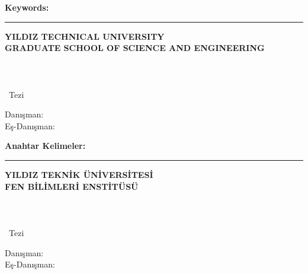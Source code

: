 \abstractTextEnglish

{\bfseries Keywords:} \abstractKeywordsEnglish

\vfill


\begin{center}
\rule{0.8\textwidth}{.1pt}

\bfseries \small
 YILDIZ TECHNICAL UNIVERSITY\\
 GRADUATE SCHOOL OF SCIENCE AND ENGINEERING
\end{center}

\newpage
\chapter*{\tabstract}

\begin{center}
{\bfseries \Large\titleTR}

\student

\departmentTR \\ {\tdegree~Tezi}

Danışman: \advisorTR \\
\ifnum{}
Eş-Danışman: \coadvisorTR
\fi  


\end{center}

\abstractTextTurkish

{\bfseries Anahtar Kelimeler:} \abstractKeywordsTurkish

\vfill


\begin{center}
\rule{0.8\textwidth}{.1pt}

\bfseries \small
 YILDIZ TEKNİK ÜNİVERSİTESİ\\
 FEN BİLİMLERİ ENSTİTÜSÜ
\end{center}

\else
\newpage
\chapter*{\tabstract}

\begin{center}
{\bfseries \Large\titleTR}

\student

\departmentTR \\ {\tdegree~Tezi}

Danışman: \advisorTR \\
\ifnum{}
Eş-Danışman: \coadvisorTR
\fi


\end{center}

